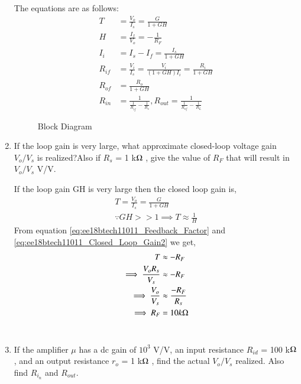 \begin{enumerate}[label=\thesection.\arabic*.,ref=\thesection.\theenumi]
\solution The equations are as follows:
%
\begin{align}
\label{eq:ee18btech11011_Closed_loop_Gain1}
T &= \frac{V_{o}}{I_{s}} = \frac{G}{1+GH}
\\
\label{eq:ee18btech11011_Feedback_Factor}
H &= \frac{I_{f}}{V_{o}} = -\frac{1}{R_F}
\\
\label{eq:ee18btech11011_I_i}
I_{i} &= I_{s} - I_{f} = \frac{I_{s}}{1+GH}
\\
\label{eq:ee18btech11011_R_if}
R_{i f} &= \frac{V_{i}}{I_{s}} = \frac{V_{i}}{(1+GH)I_{i}} =\frac{R_{i}}{1+GH}
\\
\label{eq:ee18btech11011_R_of}
R_{o f} &= \frac{R_{o}}{1+GH}
\\
\label{eq:ee18btech11011_R_in_and_R_out}
R_{i n} &= \frac{1}{\frac{1}{R_{i f}} - \frac{1}{R_{s}}} , R_{o u t} = \frac{1}{\frac{1}{R_{o f}} - \frac{1}{R_{L}}}
\end{align}
%

\begin{table}[!ht]
\centering

\caption{}
\label{table: Parameters_Table}
\end{table}

\begin{figure}[!ht]
	\begin{center}
			\resizebox{\columnwidth}{!}{}
	\end{center}
\caption{Block Diagram}
\label{fig:Block Diagram}
\end{figure}

\item If the loop gain is very large, what approximate closed-loop voltage gain $V_{o}/V_{s}$ is realized?Also if $R_{s}$ = 1 k$\ohm$ , give the value of $R_{F}$ that will result in $V_{o}/V_{s}$  V/V.

\solution If the loop gain GH is very large then the closed loop gain is,
%
\begin{align}
T = \frac{V_{o}}{I_{s}} = \frac{G}{1+GH}
\\
\because GH >> 1 \implies T \approx \frac{1}{H}
\label{eq:ee18btech11011_Closed_Loop_Gain2}
\end{align}
%
From equation \ref{eq:ee18btech11011_Feedback_Factor} and \ref{eq:ee18btech11011_Closed_Loop_Gain2} we get,
%
\begin{align}
T &\approx -R_{F}
\\
\implies \frac{V_{o}R_s}{V_{s}} &\approx -R_{F}
\\
\implies \frac{V_{o}}{V_{s}} &\approx \frac{-R_{F}}{R_{s}}
\\
\implies R_F &= 10k\ohm
\end{align}
%
\\
\item If the amplifier $\mu$ has a dc gain of $10^3$ V/V, an input resistance $R_{i d}$ = 100 k$\ohm$ , and an output resistance $r_{o}$ = 1 k$\ohm$ , find the actual $V_{o}/V_{s}$ realized. Also find $R_i_n$ and $R_{o u t}$.


\end{enumerate}
